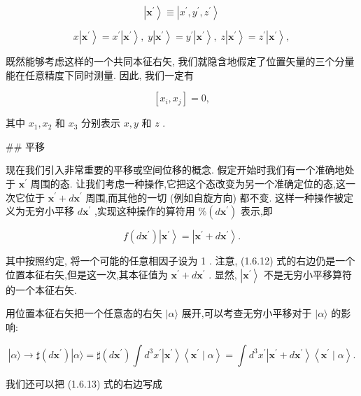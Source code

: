 \documentclass[lang=cn,newtx,10pt,scheme=chinese,thmcnt=section]{elegantbook}
\begin{document}
$$
\left| {\mathbf{x}}^{\prime }\right\rangle \equiv \left| {{x}^{\prime },{y}^{\prime },{z}^{\prime }}\right\rangle \tag{1.6.10a}
$$

$$
x\left| {\mathbf{x}}^{\prime }\right\rangle = {x}^{\prime }\left| {\mathbf{x}}^{\prime }\right\rangle ,\;y\left| {\mathbf{x}}^{\prime }\right\rangle = {y}^{\prime }\left| {\mathbf{x}}^{\prime }\right\rangle ,\;z\left| {\mathbf{x}}^{\prime }\right\rangle = {z}^{\prime }\left| {\mathbf{x}}^{\prime }\right\rangle , \tag{1.6.10b}
$$

既然能够考虑这样的一个共同本征右矢, 我们就隐含地假定了位置矢量的三个分量能在任意精度下同时测量. 因此, 我们一定有

$$
\left\lbrack {{x}_{i},{x}_{j}}\right\rbrack = 0, \tag{1.6.11}
$$

其中 ${x}_{1},{x}_{2}$ 和 ${x}_{3}$ 分别表示 $x, y$ 和 $z$ .

## 平移

现在我们引入非常重要的平移或空间位移的概念. 假定开始时我们有一个准确地处于 ${\mathbf{x}}^{\prime }$ 周围的态. 让我们考虑一种操作,它把这个态改变为另一个准确定位的态,这一次它位于 ${\mathbf{x}}^{\prime } + d{\mathbf{x}}^{\prime }$ 周围,而其他的一切 (例如自旋方向) 都不变. 这样一种操作被定义为无穷小平移 $d{\mathbf{x}}^{\prime }$ ,实现这种操作的算符用 $\% \left( {d{\mathbf{x}}^{\prime }}\right)$ 表示,即

$$
f\left( {d{\mathbf{x}}^{\prime }}\right) \left| {\mathbf{x}}^{\prime }\right\rangle = \left| {{\mathbf{x}}^{\prime } + d{\mathbf{x}}^{\prime }}\right\rangle . \tag{1.6.12}
$$

其中按照约定, 将一个可能的任意相因子设为 1 . 注意, (1.6.12) 式的右边仍是一个位置本征右矢,但是这一次,其本征值为 ${\mathbf{x}}^{\prime } + d{\mathbf{x}}^{\prime }$ . 显然, $\left| {\mathbf{x}}^{\prime }\right\rangle$ 不是无穷小平移算符的一个本征右矢.

用位置本征右矢把一个任意态的右矢 $|\alpha \rangle$ 展开,可以考查无穷小平移对于 $|\alpha \rangle$ 的影响:

$$
\left| {\alpha \rangle \rightarrow \sharp \left( {d{\mathbf{x}}^{\prime }}\right) }\right| \alpha \rangle = \sharp \left( {d{\mathbf{x}}^{\prime }}\right) \int {d}^{3}{x}^{\prime }\left| {\mathbf{x}}^{\prime }\right\rangle \left\langle {{\mathbf{x}}^{\prime } \mid \alpha }\right\rangle = \int {d}^{3}{x}^{\prime }\left| {{\mathbf{x}}^{\prime } + d{\mathbf{x}}^{\prime }}\right\rangle \left\langle {{\mathbf{x}}^{\prime } \mid \alpha }\right\rangle . \tag{1.6.13}
$$

我们还可以把 (1.6.13) 式的右边写成
\end{document}
